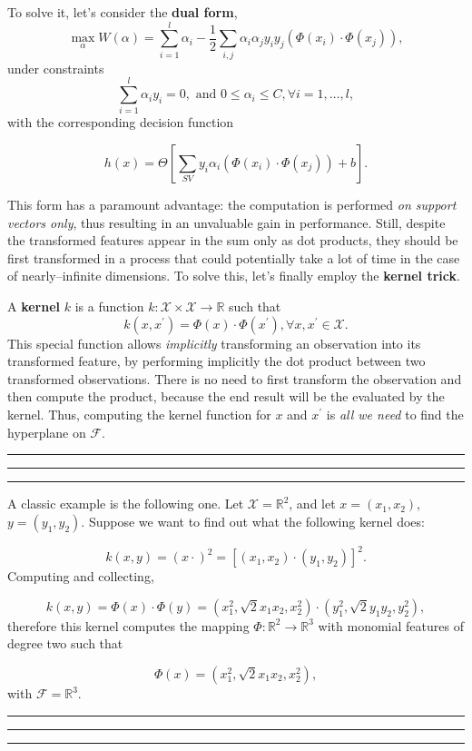\documentclass[10pt]{report}
\begin{document}
To solve it, let's consider the \textbf{dual form},
\[\max_{\alpha} W(\alpha) = \sum_{i=1}^l \alpha_i - \frac 1 2 \sum_{i,j} \alpha_i \alpha_j y_i y_j (\Phi(x_i) \cdot \Phi(x_j)),\]
under constraints
\[\sum_{i=1}^l \alpha_i y_i = 0, \mbox{ and } 0 \leq \alpha_i \leq C, \forall i=1,\dots,l,\] with the corresponding decision function

$$h(x) = \Theta\left[\sum_{SV} y_i\alpha_i(\Phi(x_i) \cdot \Phi(x_j)) + b\right].$$

This form has a paramount advantage: the computation is performed \emph{on support
vectors only}, thus resulting in an unvaluable gain in performance. Still,
despite the transformed features appear in the sum only as dot products, they
should be first transformed in a process that could potentially take a lot of
time in the case of nearly--infinite dimensions. To solve this, let's finally
employ the \textbf{kernel trick}.

A \textbf{kernel} \(k\) is a function \(k : \mathcal X \times \mathcal X \rightarrow \mathbb R\) such that $$k(x, x^\prime) = \Phi(x) \cdot \Phi(x^\prime), \forall x, x^\prime \in \mathcal X.$$ This special function allows \emph{implicitly} transforming an observation into its transformed feature, by performing
implicitly the dot product between two transformed observations. There is no
need to first transform the observation and then compute the product, because
the end result will be the evaluated by the kernel. Thus, computing the kernel
function for \(x\) and \(x^\prime\) is \emph{all we need} to find the hyperplane on
\(\mathcal F\).

\vspace*{0.6cm}\hrule
\hrule
\hrule
\vspace*{0.4cm}

A classic example is the following one. Let \(\mathcal X = \mathbb R^2\), and let
\(x = (x_1, x_2)\), \(y=(y_1,y_2)\). Suppose we want to find out what the following
kernel does:

$$k(x,y) = (x\cdot)^2 = [(x_1, x_2)\cdot(y_1, y_2)]^2.$$ Computing and collecting,

$$k(x,y) = \Phi(x)\cdot \Phi(y) = (x_1^2, \sqrt{2}x_1x_2, x_2^2)\cdot (y_1^2, \sqrt{2}y_1y_2, y_2^2),$$ therefore this kernel computes the mapping \(\Phi:\mathbb R^2 \rightarrow \mathbb R^3\) with monomial features of degree two such that

$$\Phi(x) = (x_1^2, \sqrt{2}x_1x_2, x_2^2),$$ with \(\mathcal F = \mathbb R^3\).

\vspace*{0.6cm}\hrule
\hrule
\hrule
\vspace*{0.4cm}
\end{document}
